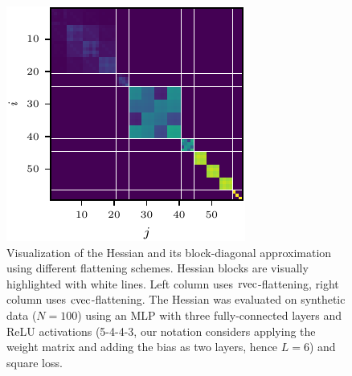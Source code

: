 \begin{figure}
\begin{minipage}[t]{0.495\linewidth}
  \end{minipage}
  \hfill
  \begin{minipage}[t]{0.495\linewidth}
    \centering
    \includegraphics[width=\linewidth]{../kfs/plots/synthetic_rvec_hessian_bda.pdf}
  \end{minipage}
  \caption{Visualization of the Hessian and its block-diagonal approximation using different flattening schemes.
    Hessian blocks are visually highlighted with white lines.
    Left column uses $\operatorname{rvec}$-flattening, right column uses $\operatorname{cvec}$-flattening.
    The Hessian was evaluated on synthetic data ($N=100$) using an MLP with three fully-connected layers and ReLU activations (5-4-4-3, our notation considers applying the weight matrix and adding the bias as two layers, hence $L=6$) and square loss.
  }
\end{figure}

\switchcolumn[0]

